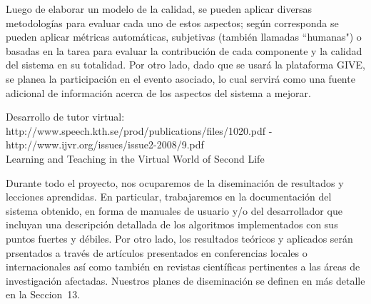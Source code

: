 Luego de elaborar un modelo de la calidad, se pueden aplicar diversas metodolog\'ias para evaluar cada uno de estos aspectos; seg\'un corresponda se pueden aplicar m\'etricas autom\'aticas, subjetivas (tambi\'en llamadas ``humanas") o basadas en la tarea para evaluar la contribuci\'on de cada componente y la calidad del sistema en su totalidad.
Por otro lado, dado que se usar\'a la plataforma GIVE, se planea la participaci\'on en el evento asociado, lo cual servir\'a como una fuente adicional de informaci\'on acerca de los aspectos del sistema a mejorar.



Desarrollo de tutor virtual:  http://www.speech.kth.se/prod/publications/files/1020.pdf - \\
http://www.ijvr.org/issues/issue2-2008/9.pdf \\
Learning and Teaching in the Virtual World of Second Life\\

\citep{Eskenazi09, Wik09, Doswell05}


Durante todo el proyecto, nos ocuparemos de la diseminaci\'on de resultados y lecciones aprendidas.  En particular, trabajaremos en la documentaci\'on del sistema obtenido, en forma de manuales de usuario y/o del desarrollador que incluyan una descripci\'on detallada de los algoritmos implementados con sus puntos fuertes y d\'ebiles.
Por otro lado, los resultados te\'oricos y aplicados ser\'an prsentados a trav\'es de art\'iculos presentados en conferencias locales o internacionales as\'i como tambi\'en en revistas cient\'ificas pertinentes a las \'areas de investigaci\'on afectadas.  Nuestros
planes de diseminaci\'on se definen en m\'as detalle en la Seccion~13.



%
%
%
%
%
%
%
%
%


